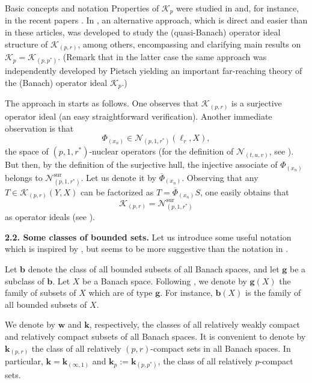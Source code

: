 \documentclass[a4paper,11pt]{amsart}
\theoremstyle{definition}
\theoremstyle{definition}
\theoremstyle{definition}
\begin{document}
\begin{section}{Basic concepts and notation}
Properties of ${{\mathcal K}} _p$ were studied in \cite{SK1} and, for instance, in the recent papers \cite{DPS1, DPS2, SK2}. In \cite{ALO}, an alternative approach, which is direct and easier than in these articles, was developed to study the (quasi-Banach) operator ideal structure of ${{\mathcal K}}_{{(p,r)}}$, among others, encompassing and clarifying main results on ${{\mathcal K}}_p = {{\mathcal K}}_{(p, {p^{\ast}})}$. (Remark that in the latter case the same approach was independently developed by Pietsch \cite{P2} yielding an important far-reaching theory of the (Banach) operator ideal ${{\mathcal K}}_p$.)

The approach in \cite{ALO} starts as follows. One observes that ${{\mathcal K}}_{{(p,r)}}$ is a surjective operator ideal (an easy straightforward verification). Another immediate observation is that 
\[
\Phi_{(x_n)}\in {{\mathcal N}} _{(p,1,{r^{\ast}})}(\ell_r, X),
\]
the space of $(p,1,{r^{\ast}})$-nuclear operators (for the definition of ${{\mathcal N}}_{(t,u,v)}$, see \cite[18.1.1]{P}). But then, by the definition of the surjective hull, the injective associate of $\Phi_{(x_n)}$ belongs to ${{\mathcal N}}_{(p,1,{r^{\ast}})}^{\mathrm{sur}}$. Let us denote it by $\overline\Phi_{(x_n)}$. Observing that any $T \in{{\mathcal K}}_{{(p,r)}} (Y,X)$ can be factorized as $T= \overline \Phi _{(x_n)}S$, one easily obtains that 
\[
{{\mathcal K}}_{(p,r)}={{\mathcal N}}_{(p,1,{r^{\ast}} )}^{\mathrm{sur}}
\]
as operator ideals (see \cite[Theorem 3.2]{ALO}).

\bigskip

{\bf 2.2. Some classes of bounded sets.} Let us introduce some useful notation which is inspired by \cite{S3}, but seems to be more suggestive than the notation in \cite{S3}.

Let ${\boldsymbol{{b}}}$ denote the class of all bounded subsets of all Banach spaces, and let ${\boldsymbol{{g}}}$ be a subclass of ${\boldsymbol{{b}}}$. Let $X$ be a Banach space. Following \cite[Definition~1.1]{S3}, we denote by ${\boldsymbol{{g}}}(X)$ the family of subsets of $X$ which are of type ${\boldsymbol{{g}}}$. For instance, ${\boldsymbol{{b}}}(X)$ is the family of all bounded subsets of $X$.

We denote by ${\boldsymbol{w}}$ and ${\boldsymbol{k}}$, respectively, the classes of all relatively weakly compact and relatively compact subsets of all Banach spaces. It is convenient to denote by ${\boldsymbol{{k}}}_{{(p,r)}}$ the class of all relatively ${{(p,r)}}$-compact sets in all Banach spaces. In particular, ${\boldsymbol{k}}= {\boldsymbol{k}} _{(\infty, 1)}$ and ${\boldsymbol{k}} _p := {\boldsymbol{k}}_{(p,{p^{\ast}})}$, the class of all relatively $p$-compact sets.


\end{section}
\end{document}
